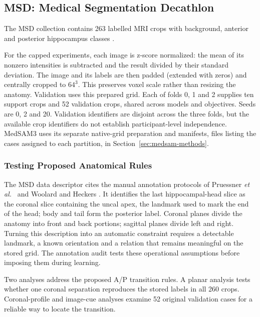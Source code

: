 \documentclass[12pt,a4paper]{article}
\begin{document}
\subsection{MSD: Medical Segmentation Decathlon}
\label{sec:msd-data-methods}


The MSD collection contains 263 labelled MRI crops with background,
anterior and posterior hippocampus classes \cite{simpson2019dataset}.

For the capped experiments, each image is z-score normalized: the mean of
its nonzero intensities is subtracted and the result divided by their
standard deviation. The image and its labels are then padded (extended with
zeros) and centrally cropped to $64^3$. This preserves voxel scale rather
than resizing the anatomy. Validation uses this prepared grid. Each of folds
0, 1 and 2 supplies ten support crops and 52 validation crops, shared across
models and objectives. Seeds are 0, 2 and 20. Validation identifiers are
disjoint across the three folds, but the available crop identifiers do not
establish participant-level independence. MedSAM3 uses its separate
native-grid preparation and manifests, files listing the cases assigned to
each partition, in Section~\ref{sec:medsam-methods}.

\subsubsection{Testing Proposed Anatomical Rules}
\label{sec:annotation-compatibility}

The MSD data descriptor \cite{simpson2019dataset} cites the manual
annotation protocols of Pruessner \emph{et al.}\
\cite{pruessner2000volumetry} and Woolard and Heckers
\cite{woolard2012asymmetry}. It identifies the last hippocampal-head slice
as the coronal slice containing the uncal apex, the landmark used to mark
the end of the head; body and tail form the posterior label. Coronal planes
divide the anatomy into front and back portions; sagittal planes divide left
and right. Turning this description into an automatic constraint requires a
detectable landmark, a known orientation and a relation that remains
meaningful on the stored grid. The annotation audit tests these operational
assumptions before imposing them during learning.

Two analyses address the proposed A/P transition rules. A planar analysis tests
whether one coronal separation reproduces the stored labels in all
260 crops. Coronal-profile and image-cue analyses examine 52 original
validation cases for a reliable way to locate the transition.
\end{document}
